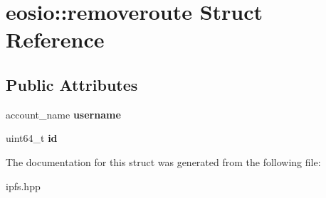 \hypertarget{structeosio_1_1removeroute}{}\section{eosio\+:\+:removeroute Struct Reference}
\label{structeosio_1_1removeroute}
\subsection*{Public Attributes}
\begin{DoxyCompactItemize}
\item 
\mbox{\label{structeosio_1_1removeroute_a025dea1516c108adeb3473d5b496f3b1}} 
account\+\_\+name {\bfseries username}
\item 
\mbox{\label{structeosio_1_1removeroute_a99ca5aab3b76721e9b0942097059845d}} 
uint64\+\_\+t {\bfseries id}
\end{DoxyCompactItemize}


The documentation for this struct was generated from the following file\+:\begin{DoxyCompactItemize}
\item 
ipfs.\+hpp\end{DoxyCompactItemize}
